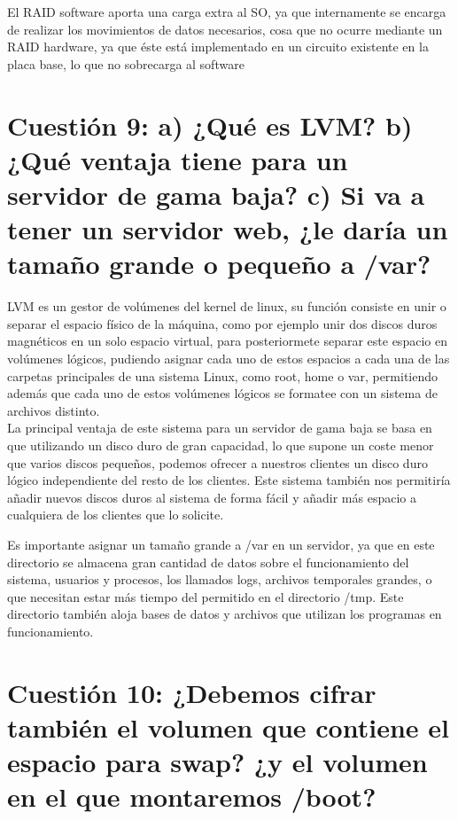 El RAID software aporta una carga extra al SO, ya que internamente se encarga de realizar los movimientos de datos necesarios, cosa que no ocurre mediante un RAID hardware, ya que éste está implementado en un circuito existente en la placa base, lo que no sobrecarga al software

\section{Cuestión 9: a) ¿Qué es LVM? b)¿Qué ventaja tiene para un servidor de gama baja? c) Si va a tener un servidor web, ¿le daría un tamaño grande o pequeño a /var?}

LVM es un gestor de volúmenes del kernel de linux\cite{21}, su función consiste en unir o separar el espacio físico de la máquina, como por ejemplo unir dos discos duros magnéticos en un solo espacio virtual, para posteriormete separar este espacio en volúmenes lógicos, pudiendo asignar cada uno de estos espacios a cada una de las carpetas principales de una sistema Linux, como root, home o var, permitiendo además que cada uno de estos volúmenes lógicos se formatee con un sistema de archivos distinto\cite{22}.\\
La principal ventaja de este sistema para un servidor de gama baja se basa en que utilizando un disco duro de gran capacidad, lo que supone un coste menor que varios discos pequeños, podemos ofrecer a nuestros clientes un disco duro lógico independiente del resto de los clientes. Este sistema también nos permitiría añadir nuevos discos duros al sistema de forma fácil y añadir más espacio a cualquiera de los clientes que lo solicite.

Es importante asignar un tamaño grande a /var en un servidor, ya que en este directorio se almacena gran cantidad de datos sobre el funcionamiento del sistema, usuarios y procesos, los llamados logs, archivos temporales grandes, o que necesitan estar más tiempo del permitido en el directorio /tmp. Este directorio también aloja bases de datos y archivos que utilizan los programas en funcionamiento.\cite{var}

\section{Cuestión 10: ¿Debemos cifrar también el volumen que contiene el espacio para swap? ¿y el volumen en el que montaremos /boot?}

